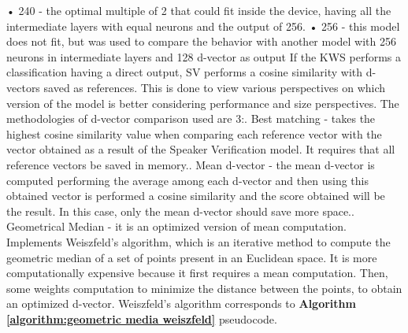 • 240 - the optimal multiple of 2 that could fit inside the device, having all the intermediate layers with equal neurons and the output of 256.\newline
• 256 - this model does not fit, but was used to compare the behavior with another model with 256 neurons in intermediate layers and 128 d-vector as output\newline
If the KWS performs a classification having a direct output, SV performs a cosine similarity with d-vectors saved as references. This is done to view various perspectives on which version of the model is better considering performance and size perspectives. The methodologies of d-vector comparison used are 3:. Best matching - takes the highest cosine similarity value when comparing each reference vector with the vector obtained as a result of the Speaker Verification model. It requires that all reference vectors be saved in memory.. Mean d-vector - the mean d-vector is computed performing the average among each d-vector and then using this obtained vector is performed a cosine similarity and the score obtained will be the result. In this case, only the mean d-vector should save more space.. Geometrical Median - it is an optimized version of mean computation. Implements Weiszfeld's algorithm\cite{weiszfeldsalgorithm}, which is an iterative method to compute the geometric median of a set of points present in an Euclidean space. It is more computationally expensive because it first requires a mean computation. Then, some weights computation to minimize the distance between the points, to obtain an optimized d-vector. Weiszfeld's algorithm corresponds to \textbf{Algorithm \ref{algorithm:geometric media weiszfeld}} pseudocode.\newline
